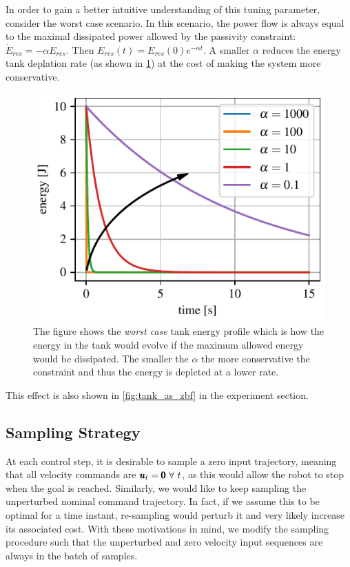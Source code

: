 In order to gain a better intuitive understanding of this tuning parameter, consider the worst case scenario. In this scenario, the power flow is always equal to the maximal dissipated power allowed by the passivity constraint: $\dot{E}_{res} = - \alpha E_{res}$. Then $E_{res}(t) = E_{res}(0) e^{-\alpha t}$. A smaller $\alpha$ reduces the energy tank deplation rate  (as shown in \fig \ref{fig:worst_case_energy_profile}) at the cost of making the system more conservative.
\begin{figure}[t]
    \centering
    \includegraphics[width=0.8\columnwidth]{figures/worst_case_energy_profile.pdf}
    \caption{The figure shows the \textit{worst case} tank energy profile which is how the energy in the tank would evolve if the maximum allowed energy would be dissipated. The smaller the $\alpha$ the more conservative the constraint and thus the energy is depleted at a lower rate.}
    \label{fig:worst_case_energy_profile}
\end{figure}
This effect is also shown in \fig \ref{fig:tank_as_zbf} in the experiment section.

\subsection{Sampling Strategy}
At each control step, it is desirable to sample a zero input trajectory, meaning that all velocity commands are $\pmb{u}_t = \pmb{0}\ \forall\ t$, as this would allow the robot to stop when the goal is reached. Similarly, we would like to keep sampling the unperturbed nominal command trajectory. In fact, if we assume this to be optimal for a time instant, re-sampling would perturb it and very likely increase its associated cost. With these motivations in mind, we modify the sampling procedure such that the unperturbed and zero velocity input sequences are always in the batch of samples.

